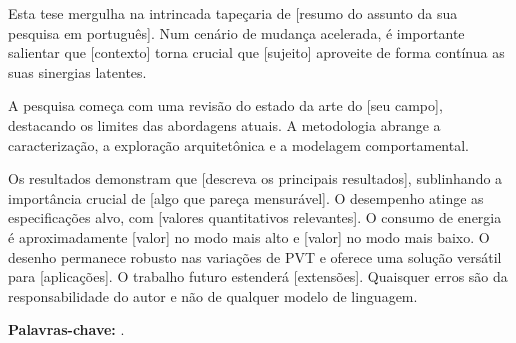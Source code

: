 
Esta tese mergulha na intrincada tapeçaria de [resumo do assunto da sua
pesquisa em português]. Num cenário de mudança acelerada, é importante
salientar que [contexto] torna crucial que [sujeito] aproveite de forma
contínua as suas sinergias latentes.

A pesquisa começa com uma revisão do estado da arte do [seu campo],
destacando os limites das abordagens atuais. A metodologia abrange a
caracterização, a exploração arquitetônica e a modelagem comportamental.

Os resultados demonstram que [descreva os principais resultados],
sublinhando a importância crucial de [algo que pareça mensurável]. O
desempenho atinge as especificações alvo, com [valores quantitativos
relevantes]. O consumo de energia é aproximadamente [valor] no modo mais
alto e [valor] no modo mais baixo. O desenho permanece robusto nas
variações de PVT e oferece uma solução versátil para [aplicações]. O
trabalho futuro estenderá [extensões]. Quaisquer erros são da
responsabilidade do autor e não de qualquer modelo de linguagem.

\medskip
\noindent\textbf{Palavras-chave:} \thesiskeywords.
